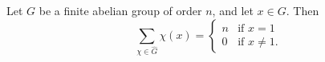 Let $G$ be a finite abelian group of order $n$, and let $x \in G$. Then
$$\sum_{\chi \in \widehat{G}} \chi(x) = \begin{cases} n & \text{if } x = 1 \\ 0 & \text{if } x \neq 1. \end{cases}$$
